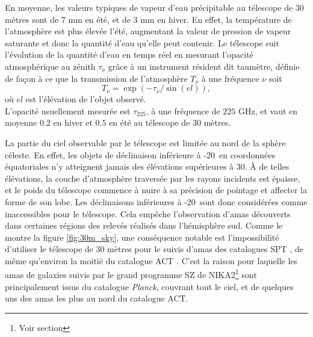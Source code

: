 En moyenne, les valeurs typiques de vapeur d'eau précipitable au télescope de 30 mètres sont de 7 mm en été, et de 3 mm en hiver.
En effet, la température de l'atmosphère est plus élevée l'été, augmentant la valeur de pression de vapeur saturante et donc la quantité d'eau qu'elle peut contenir.
Le télescope suit l'évolution de la quantité d'eau en temps réel en mesurant l'opacité atmosphérique au zénith $\tau_\nu$ grâce à un instrument résident dit taumètre, définie de façon à ce que la transmission de l'atmosphère $T_\nu$ à une fréquence $\nu$ soit
\begin{equation}
    \label{eq:tau_trans}
    T_\nu = \exp(- \tau_\nu / \sin(el)),
\end{equation}
où $el$ est l'élévation de l'objet observé. \\
L'opacité usuellement mesurée est $\tau_{225}$, à une fréquence de $225$ GHz, et vaut en moyenne $0.2$ en hiver et $0.5$ en été au télescope de 30 mètres.

La partie du ciel observable par le télescope est limitée au nord de la sphère céleste.
En effet, les objets de déclinaison inférieure à -20\textdegree\ en coordonnées équatoriales n'y atteignent jamais des élévations supérieures à 30\textdegree.
À de telles élévations, la couche d'atmosphère traversée par les rayons incidents est épaisse, et le poids du télescope commence à nuire à sa précision de pointage et affecter la forme de son lobe.
Les déclinaisons inférieures à -20\textdegree\ sont donc considérées comme inaccessibles pour le télescope.
Cela empêche l'observation d'amas découverts dans certaines régions des relevés réalisés dans l'hémisphère sud.
Comme le montre la figure \ref{fig:30m_sky}, une conséquence notable est l'impossibilité d'utiliser le télescope de 30 mètres pour le suivis d'amas des catalogues SPT \cite{bleem_galaxy_2015,bleem_sptpol_2020}, de même qu'environ la moitié du catalogue ACT \cite{hilton_atacama_2021}.
C'est la raison pour laquelle les amas de galaxies suivis par le grand programme SZ de NIKA2\footnote{Voir section } sont principalement issus du catalogue \textit{Planck}, couvrant tout le ciel, et de quelques uns des amas les plus au nord du catalogue ACT.

